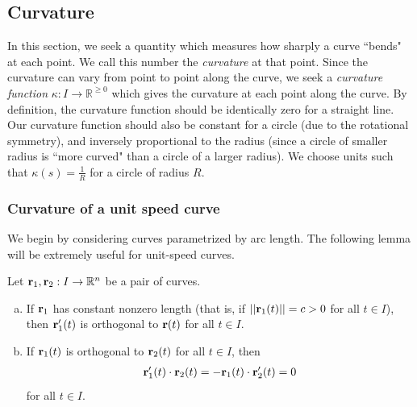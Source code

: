 \documentclass[12pt,letterpaper,reqno]{article}
\numberwithin{equation}{section}
\newcommand{\R}{\ensuremath{\mathbb R}}
\newcommand{\bbr}{{\bf r}}
\begin{document}
{{}

\newpage 

\subsection{Curvature}
In this section, we seek a quantity which measures how sharply a curve ``bends" at each point. We call this number the \emph{curvature} at that point. Since the curvature can vary from point to point along the curve, we seek a \emph{curvature function} $\kappa:I \to \R^{\geq 0}$ which gives the curvature at each point along the curve. By definition, the curvature function should be identically zero for a straight line. Our curvature function should also be constant for a circle (due to the rotational symmetry), and inversely proportional to the radius (since a circle of smaller radius is ``more curved" than a circle of a larger radius). We choose units such that $\kappa(s)=\frac{1}{R}$ for a circle of radius $R$.

\subsubsection{Curvature of a unit speed curve}
We begin by considering curves parametrized by arc length. The following lemma will be extremely useful for unit-speed curves.

\begin{lem}\label{lem:some_dot_products}
Let $\bbr_1, \bbr_2:I \to \R^n$ be a pair of curves.
\begin{enumerate}[(a)]
	\item If $\bbr_1$ has constant nonzero length (that is, if $||\bbr_1(t)||=c>0$ for all $t \in I$), then $\bbr_1'(t)$ is orthogonal to $\bbr(t)$ for all $t \in I$.
	\item If $\bbr_1(t)$ is orthogonal to $\bbr_2(t)$ for all $t \in I$, then
	\begin{align*}
		\bbr_1'(t) \cdot \bbr_2(t)=-\bbr_1(t) \cdot \bbr_2'(t)=0
	\end{align*}
	for all $t \in I$.
\end{enumerate}	
\end{lem}

}
\end{document}
